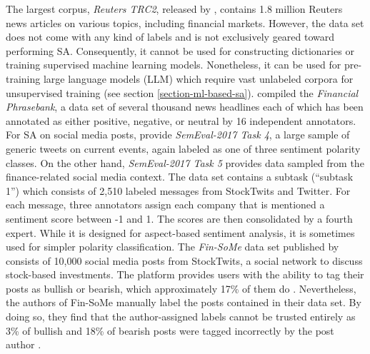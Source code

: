 The largest corpus, \emph{Reuters TRC2}, released by , contains 1.8 million Reuters news articles on various topics, including financial markets. However, the data set does not come with any kind of labels and is not exclusively geared toward performing SA. Consequently, it cannot be used for constructing dictionaries or training supervised machine learning models. Nonetheless, it can be used for pre-training large language models (LLM) which require vast unlabeled corpora for unsupervised training (see section \ref{section-ml-based-sa}).  compiled the \emph{Financial Phrasebank}, a data set of several thousand news headlines each of which has been annotated as either positive, negative, or neutral by 16 independent annotators. For SA on social media posts,  provide \emph{SemEval-2017 Task 4}, a large sample of generic tweets on current events, again labeled as one of three sentiment polarity classes. On the other hand, \emph{SemEval-2017 Task 5}  provides data sampled from the finance-related social media context. The data set contains a subtask (``subtask 1'') which consists of 2,510 labeled messages from StockTwits and Twitter. For each message, three annotators assign each company that is mentioned a sentiment score between -1 and 1. The scores are then consolidated by a fourth expert. While it is designed for aspect-based sentiment analysis, it is sometimes used for simpler polarity classification. The \emph{Fin-SoMe} data set published by  consists of 10,000 social media posts from StockTwits, a social network to discuss stock-based investments. The platform provides users with the ability to tag their posts as bullish or bearish, which approximately 17\% of them do . Nevertheless, the authors of Fin-SoMe manually label the posts contained in their data set. By doing so, they find that the author-assigned labels cannot be trusted entirely as 3\% of bullish and 18\% of bearish posts were tagged incorrectly by the post author .

